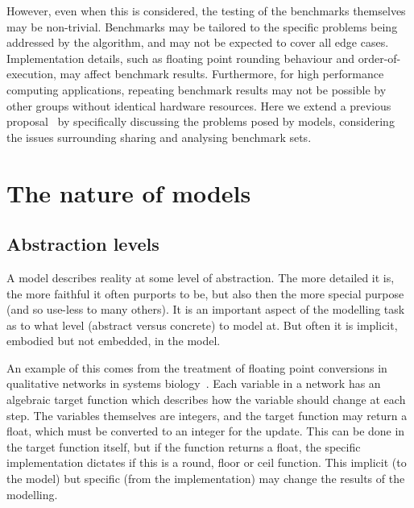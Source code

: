 \documentclass[conference]{IEEEtran}
\begin{document}
However, even when this is considered, the testing of the benchmarks
themselves may be non-trivial. Benchmarks may be tailored to the
specific problems being addressed by the algorithm, and may not be
expected to cover all edge cases. Implementation details, such as
floating point rounding behaviour and order-of-execution, may affect 
benchmark results. Furthermore, for high performance computing 
applications, repeating
benchmark results may not be possible by other groups without
identical hardware resources. Here we extend a previous
proposal~\cite{crick-et-al_wssspe2} by specifically discussing the 
problems posed by models, considering the issues surrounding sharing
and analysing benchmark sets.



\section{The nature of models}

\subsection{Abstraction levels} 

A model describes reality at some level of abstraction. The more
detailed it is, the more faithful it often purports to be, but also then the more
special purpose (and so use-less to many others). It is an important
aspect of the modelling task as to what level (abstract versus
concrete) to model at. But often it is implicit, embodied but not
embedded, in the model.

An example of this comes from the treatment of floating point
conversions in qualitative networks in systems
biology~\cite{Schaub2007}. Each variable in a network has an algebraic
target function which describes how the variable should change at each
step. The variables themselves are integers, and the target function
may return a float, which must be converted to an integer for the
update. This can be done in the target function itself, but if the
function returns a float, the specific implementation dictates if this
is a round, floor or ceil function. This implicit (to the model) but
specific (from the implementation) may change the results of the
modelling.
\end{document}
